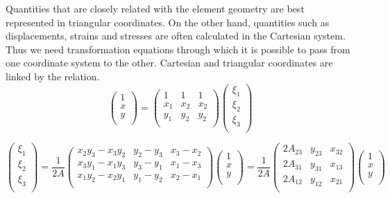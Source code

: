 Quantities that are closely related with the element geometry are best represented in triangular coordinates. On the other hand, quantities such as displacements, strains and stresses are often calculated in the Cartesian system. Thus we need transformation equations through which it is possible to pass from one coordinate system to the other. Cartesian and triangular coordinates are linked by the relation.
\begin{equation}
\begin{pmatrix}
1 \\
x \\
y \\
\end{pmatrix}
= 
\begin{pmatrix}
1&1&1 \\
x_1&x_2&x_2 \\
y_1&y_2&y_2 \\
\end{pmatrix}
\begin{pmatrix}
\xi_1 \\
\xi_2 \\
\xi_3 \\
\end{pmatrix}
\end{equation}

\begin{equation}
\begin{pmatrix}
\xi_1 \\
\xi_2 \\
\xi_3 \\
\end{pmatrix}
= 
\frac{1}{2A}\begin{pmatrix}
x_2y_3-x_3y_2&y_2-y_3&x_3-x_2 \\
x_3y_1-x_1y_3&y_3-y_1&x_1-x_3 \\
x_1y_2-x_2y_1&y_1-y_2&x_2-x_1 \\
\end{pmatrix}
\begin{pmatrix}
1\\
x \\
y \\
\end{pmatrix}
= 
\frac{1}{2A}\begin{pmatrix}
2A_{23}&y_{23}&x_{32} \\
2A_{31}&y_{31}&x_{13} \\
2A_{12}&y_{12}&x_{21} \\
\end{pmatrix}
\begin{pmatrix}
1 \\
x \\
y \\

\end{pmatrix}
\end{equation}


